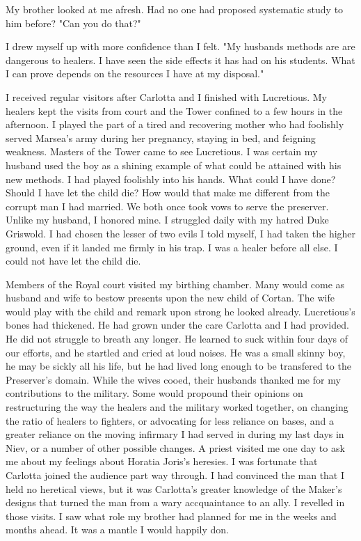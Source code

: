\documentclass{article}
\begin{document}
My brother looked at me afresh. Had no one had proposed systematic study to him before? "Can you do that?"

I drew myself up with more confidence than I felt. "My husbands methods are are dangerous to healers. I have seen the side effects it has had on his students. What I can prove depends on the resources I have at my disposal."

\vspace{.5cm}

I received regular visitors after Carlotta and I finished with Lucretious. My healers kept the visits from court and the Tower confined to a few hours in the afternoon. I played the part of a tired and recovering mother who had foolishly served Marsea's army during her pregnancy, staying in bed, and feigning weakness. Masters of the Tower came to see Lucretious. I was certain my husband used the boy as a shining example of what could be attained with his new methods. I had played foolishly into his hands. What could I have done? Should I have let the child die? How would that make me different from the corrupt man I had married. We both once took vows to serve the preserver. Unlike my husband, I honored mine. I struggled daily with my hatred Duke Griswold. I had chosen the lesser of two evils I told myself, I had taken the higher ground,  even if it landed me firmly in his trap. I was a healer before all else. I could not have let the child die.

Members of the Royal court visited my birthing chamber. Many would come as husband and wife to bestow presents upon the new child of Cortan. The wife would play with the child and remark upon strong he looked already. Lucretious's bones had thickened. He had grown under the care Carlotta and I had provided. He did not struggle to breath any longer. He learned to suck within four days of our efforts, and he startled and cried at loud noises. He was a small skinny boy, he may be sickly all his life, but he had lived long enough to be transfered to the Preserver's domain. While the wives cooed, their husbands thanked me for my contributions to the military. Some would propound their opinions on restructuring the way the healers and the military worked together, on changing the ratio of healers to fighters, or advocating for less reliance on bases, and a greater reliance on the moving infirmary I had served in during my last days in Niev, or a number of other possible changes. A priest visited me one day to ask me about my feelings about Horatia Joris's heresies. I was fortunate that Carlotta joined the audience part way through. I had convinced the man that I held no heretical views, but it was Carlotta's greater knowledge of the Maker's designs that turned the man from a wary accquaintance to an ally. I revelled in those visits. I saw what role my brother had planned for me in the weeks and months ahead. It was a mantle I would happily don. 
\end{document}
